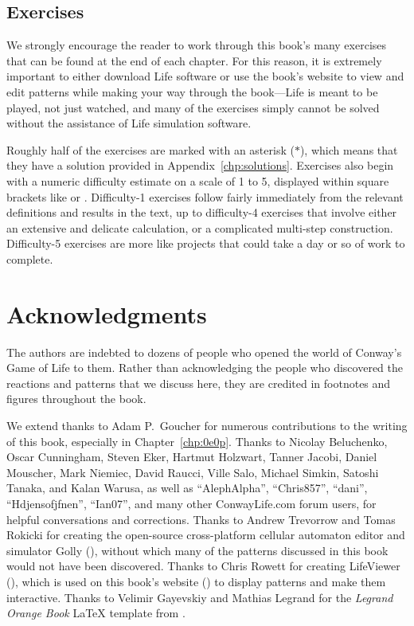 \subsection*{Exercises}

We strongly encourage the reader to work through this book's many exercises that can be found at the end of each chapter. For this reason, it is extremely important to either download Life software or use the book's website to view and edit patterns while making your way through the book---Life is meant to be played, not just watched, and many of the exercises simply cannot be solved without the assistance of Life simulation software.

Roughly half of the exercises are marked with an asterisk ($\ast$), which means that they have a solution provided in Appendix~\ref{chp:solutions}. Exercises also begin with a numeric difficulty estimate on a scale of 1 to 5, displayed within square brackets like  or . Difficulty-1 exercises follow fairly immediately from the relevant definitions and results in the text, up to difficulty-4 exercises that involve either an extensive and delicate calculation, or a complicated multi-step construction. Difficulty-5 exercises are more like projects that could take a day or so of work to complete.


\section*{Acknowledgments}

The authors are indebted to dozens of people who opened the world of Conway's Game of Life to them. Rather than acknowledging the people who discovered the reactions and patterns that we discuss here, they are credited in footnotes and figures throughout the book.

We extend thanks to Adam P.~Goucher for numerous contributions to the writing of this book, especially in Chapter~\ref{chp:0e0p}. Thanks to Nicolay Beluchenko, Oscar Cunningham, Steven Eker, Hartmut Holzwart, Tanner Jacobi, Daniel Mouscher, Mark Niemiec, David Raucci, Ville Salo, Michael Simkin, Satoshi Tanaka, and Kalan Warusa, as well as ``AlephAlpha'', ``Chris857'', ``dani'', ``Hdjensofjfnen'', ``Ian07'', and many other ConwayLife.com forum users, for helpful conversations and corrections. Thanks to Andrew Trevorrow and Tomas Rokicki for creating the open-source cross-platform cellular automaton editor and simulator Golly (), without which many of the patterns discussed in this book would not have been discovered. Thanks to Chris Rowett for creating LifeViewer (), which is used on this book's website () to display patterns and make them interactive. Thanks to Velimir Gayevskiy and Mathias Legrand for the \emph{Legrand Orange Book} LaTeX template from .

